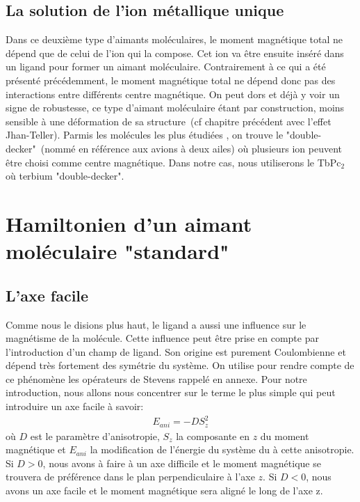 \subsection{La solution de l'ion métallique unique}
Dans ce deuxième type d'aimants moléculaires, le moment magnétique total ne dépend que de celui de l'ion qui la compose. Cet ion va \^etre ensuite inséré dans un ligand pour former un aimant moléculaire. Contrairement à ce qui a été présenté précédemment, le moment magnétique total ne dépend donc pas des interactions entre différents centre magnétique. On peut dors et déjà y voir un signe de robustesse, ce type d'aimant moléculaire étant par construction, moins sensible à une déformation de sa structure~(cf chapitre précédent avec l'effet Jhan-Teller). Parmis les molécules les plus étudiées , on trouve le "double-decker"~(nommé en référence aux avions à deux ailes) où plusieurs ion peuvent \^etre choisi comme centre magnétique. Dans notre cas, nous utiliserons le TbPc$_2$ où terbium "double-decker".



\section{Hamiltonien d'un aimant moléculaire "standard"}
\subsection{L'axe facile}
Comme nous le disions plus haut, le ligand a aussi une influence sur le magnétisme de la molécule. Cette influence peut \^etre prise en compte par l'introduction d'un champ de ligand. Son origine est purement Coulombienne
 et dépend très fortement des symétrie du système. On utilise pour rendre compte de ce phénomène les opérateurs de Stevens rappelé en annexe. Pour notre introduction, nous allons nous concentrer sur le terme le plus simple qui peut introduire un axe facile à savoir:
 \begin{eqnarray}
E_{ani} = -DS_z^2 \nonumber
\end{eqnarray}
où $D$ est le paramètre d'anisotropie, $S_z$ la composante en $z$ du moment magnétique et $E_{ani}$ la modification de l'énergie du système du à cette anisotropie. Si $D>0$, nous avons à faire à un axe difficile et le moment magnétique se trouvera de préférence dans le plan perpendiculaire à l'axe $z$. Si $D<0$, nous avons un axe facile et le moment magnétique sera aligné le long de l'axe z.


